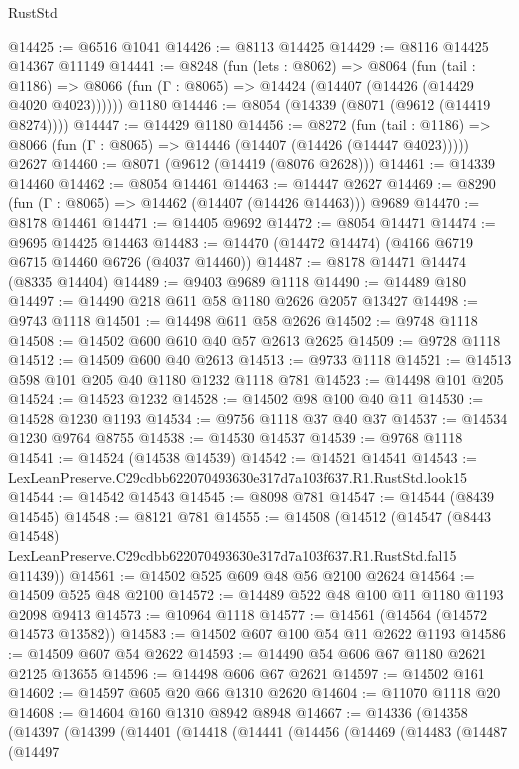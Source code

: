 \begin{lexlean}{RustStd}
\begin{coremodule}
@14425 := @6516 @1041
@14426 := @8113 @14425
@14429 := @8116 @14425 @14367 @11149
@14441 := @8248
    (fun (lets : @8062) =>
    @8064
      (fun (tail : @1186) =>
      @8066 (fun (Γ : @8065) => @14424 (@14407 (@14426 (@14429 @4020 @4023))))))
    @1180
@14446 := @8054 (@14339 (@8071 (@9612 (@14419 @8274))))
@14447 := @14429 @1180
@14456 := @8272
    (fun (tail : @1186) => @8066 (fun (Γ : @8065) => @14446 (@14407 (@14426 (@14447 @4023)))))
    @2627
@14460 := @8071 (@9612 (@14419 (@8076 @2628)))
@14461 := @14339 @14460
@14462 := @8054 @14461
@14463 := @14447 @2627
@14469 := @8290 (fun (Γ : @8065) => @14462 (@14407 (@14426 @14463))) @9689
@14470 := @8178 @14461
@14471 := @14405 @9692
@14472 := @8054 @14471
@14474 := @9695 @14425 @14463
@14483 := @14470 (@14472 @14474) (@4166 @6719 @6715 @14460 @6726 (@4037 @14460))
@14487 := @8178 @14471 @14474 (@8335 @14404)
@14489 := @9403 @9689 @1118
@14490 := @14489 @180
@14497 := @14490 @218 @611 @58 @1180 @2626 @2057 @13427
@14498 := @9743 @1118
@14501 := @14498 @611 @58 @2626
@14502 := @9748 @1118
@14508 := @14502 @600 @610 @40 @57 @2613 @2625
@14509 := @9728 @1118
@14512 := @14509 @600 @40 @2613
@14513 := @9733 @1118
@14521 := @14513 @598 @101 @205 @40 @1180 @1232 @1118 @781
@14523 := @14498 @101 @205
@14524 := @14523 @1232
@14528 := @14502 @98 @100 @40 @11
@14530 := @14528 @1230 @1193
@14534 := @9756 @1118 @37 @40 @37
@14537 := @14534 @1230 @9764 @8755
@14538 := @14530 @14537
@14539 := @9768 @1118
@14541 := @14524 (@14538 @14539)
@14542 := @14521 @14541
@14543 := LexLeanPreserve.C29cdbb622070493630e317d7a103f637.R1.RustStd.look15
@14544 := @14542 @14543
@14545 := @8098 @781
@14547 := @14544 (@8439 @14545)
@14548 := @8121 @781
@14555 := @14508
    (@14512
      (@14547
        (@8443 @14548)
        LexLeanPreserve.C29cdbb622070493630e317d7a103f637.R1.RustStd.fal15
        @11439))
@14561 := @14502 @525 @609 @48 @56 @2100 @2624
@14564 := @14509 @525 @48 @2100
@14572 := @14489 @522 @48 @100 @11 @1180 @1193 @2098 @9413
@14573 := @10964 @1118
@14577 := @14561 (@14564 (@14572 @14573 @13582))
@14583 := @14502 @607 @100 @54 @11 @2622 @1193
@14586 := @14509 @607 @54 @2622
@14593 := @14490 @54 @606 @67 @1180 @2621 @2125 @13655
@14596 := @14498 @606 @67 @2621
@14597 := @14502 @161
@14602 := @14597 @605 @20 @66 @1310 @2620
@14604 := @11070 @1118 @20
@14608 := @14604 @160 @1310 @8942 @8948
@14667 := @14336
    (@14358
      (@14397
        (@14399
          (@14401
            (@14418
              (@14441
                (@14456
                  (@14469
                    (@14483
                      (@14487
                        (@14497

\end{coremodule}
\end{lexlean}

